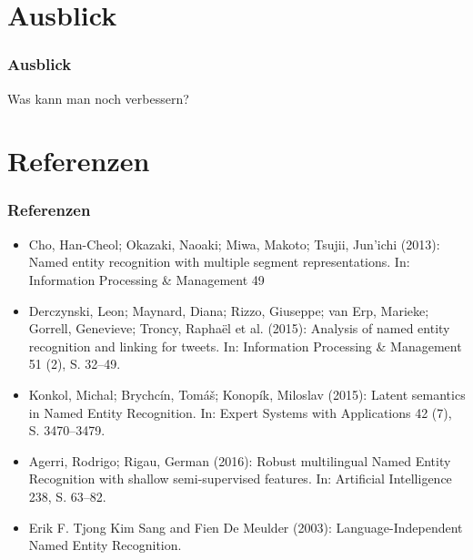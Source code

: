 \documentclass{beamer}
\begin{document}
\section{Ausblick}
	\begin{frame}
		\frametitle{Ausblick}
		Was kann man noch verbessern?
	\end{frame}
\section{Referenzen}
	\begin{frame}
		\frametitle{Referenzen}
		\begin{itemize}
			\item Cho, Han-Cheol; Okazaki, Naoaki; Miwa, Makoto; Tsujii, Jun’ichi (2013): Named entity recognition with multiple segment representations. In: Information Processing \& Management 49\\
			\item Derczynski, Leon; Maynard, Diana; Rizzo, Giuseppe; van Erp, Marieke; Gorrell, Genevieve; Troncy, Raphaël et al. (2015): Analysis of named entity recognition and linking for tweets. In: Information Processing \& Management 51 (2), S. 32–49.\\
			\item Konkol, Michal; Brychcín, Tomáš; Konopík, Miloslav (2015): Latent semantics in Named Entity Recognition. In: Expert Systems with Applications 42 (7), S. 3470–3479.\\
			\item Agerri, Rodrigo; Rigau, German (2016): Robust multilingual Named Entity Recognition with shallow semi-supervised features. In: Artificial Intelligence 238, S. 63–82.\\
			\item Erik F. Tjong Kim Sang and Fien De Meulder (2003): Language-Independent Named Entity Recognition.\\
		\end{itemize}
	\end{frame}
\end{document}

